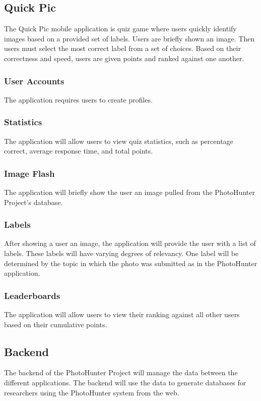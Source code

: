 \documentclass{article}
\begin{document}
\subsection{Quick Pic}
The Quick Pic mobile application is quiz game where users quickly identify
images based on a provided set of labels. Users are briefly shown an image.
Then users must select the most correct label from a set of choices. Based on
their correctness and speed, users are given points and ranked against one
another.

	\subsubsection{User Accounts}
	The application requires users to create profiles. 
	
	\subsubsection{Statistics}
  The application will allow users to view quiz statistics, such as percentage
  correct, average response time, and total points.
	
	\subsubsection{Image Flash}
  The application will briefly show the user an image pulled from the
  PhotoHunter Project's database.
	
	\subsubsection{Labels}
  After showing a user an image, the application will provide the user with a
  list of labels. These labels will have varying degrees of relevancy. One label
  will be determined by the topic in which the photo was submitted as in the
  PhotoHunter application. 
	
	\subsubsection{Leaderboards}
  The application will allow users to view their ranking against all other
  users based on their cumulative points.
	
\subsection{Backend}
The backend of the PhotoHunter Project will manage the data between the different
applications. The backend will use the data to generate databases for researchers
using the PhotoHunter system from the web.
\end{document}

